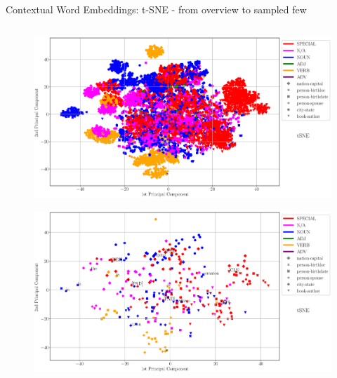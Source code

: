 \begin{frame}{Contextual Word Embeddings: t-SNE - from overview to sampled few}
\begin{columns}
\begin{column}{0.5\textwidth}
\begin{figure}
                \includegraphics[height=0.15\textheight]{graphics/contextual_embeddings/tSNE_9512_1_2_knowbert_wiki_wordnetNone_title_USE.eps}
            \end{figure}
            \begin{figure}
                \centering
                \includegraphics[height=0.55\textheight]{graphics/contextual_embeddings/tSNE_300_1_2_knowbert_wiki_wordnet_annotated_title.eps}
            \end{figure}
        \end{column}
    \end{columns}
\end{frame}


